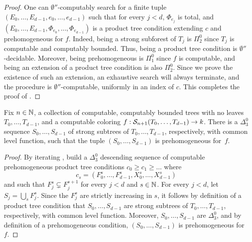 \begin{proof}
One can $\emptyset''$-computably search for a finite tuple $(E_0, \dots, E_{d-1}, e_0, \dots, e_{d-1})$
such that for every $j < d$, $\Phi_{e_j}$ is total, and  $(E_0, \dots, E_{d-1}, \Phi_{e_0}, \dots, \Phi_{e_{d-1}})$ is a product tree condition extending $c$ and prehomogeneous for $f$. Indeed, being a strong subforest of $T_j$ is $\Pi^0_2$ since $T_j$ is computable and computably bounded. Thus, being a product tree condition is $\emptyset''$-decidable. Moreover, being prehomogeneous is $\Pi^0_1$ since $f$ is computable, and being an extension of a product tree condition is also $\Pi^0_2$. Since we prove the existence of such an extension, an exhaustive search will always terminate, and the procedure is $\emptyset''$-computable, uniformly in an index of $c$.
This completes the proof of .
\end{proof}

\begin{lemma}\label{thm:milliken-prehomogeneous}
Fix $n \in \mathbb{N}$, a collection of computable, computably bounded trees with no leaves $T_0, \dots, T_{d-1}$, and a computable coloring $f: \mathcal{S}_{n+1}({T_0, \dots, T_{d-1}}) \to k$. There is a $\Delta^0_3$ sequence $S_0, \dots, S_{d-1}$ of strong subtrees of $T_0, \dots,\allowbreak T_{d-1}$, respectively, with common level function, such that the tuple $( S_0, \dots, S_{d-1} )$ is prehomogeneous for~$f$.
\end{lemma}
\begin{proof}
By iterating ,
build a $\Delta^0_3$ descending sequence of computable prehomogeneous product tree conditions
$c_0 \geq c_1 \geq \dots$ where 
$$
c_s = (F^s_0, \dots, F^s_{d-1}, X^s_0, \dots, X^s_{d-1})
$$
and such that  $F^s_j \subsetneq F^{s+1}_j$ for every $j < d$ and $s \in \mathbb{N}$.
For every $j < d$, let $S_j = \bigcup_s F^s_j$. Since the $F^s_j$ are strictly increasing in $s$, it follows by definition of a product tree condition that $S_0, \dots, S_{d-1}$ are strong subtrees of $T_0, \dots,\allowbreak T_{d-1}$, respectively, with common level function.
Moreover, $S_0, \dots, S_{d-1}$ are $\Delta^0_3$, and by definition of a prehomogeneous condition, $( S_0, \dots, S_{d-1})$ is prehomogeneous for~$f$.
\end{proof}

